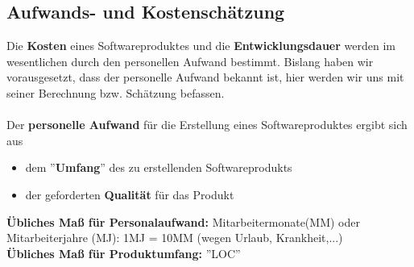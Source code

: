\subsection{Aufwands- und Kostenschätzung}
Die \textbf{Kosten} eines Softwareproduktes und die \textbf{Entwicklungsdauer} werden im wesentlichen durch den personellen Aufwand bestimmt. Bislang haben wir vorausgesetzt, dass der personelle Aufwand bekannt ist, hier werden wir uns mit seiner Berechnung bzw. Schätzung befassen.
\\
\\
Der \textbf{personelle Aufwand} für die Erstellung eines Softwareproduktes ergibt sich aus
\begin{itemize}
	\item dem ''\textbf{Umfang}'' des zu erstellenden Softwareprodukts
	\item der geforderten \textbf{Qualität} für das Produkt
\end{itemize}
\textbf{Übliches Maß für Personalaufwand:} Mitarbeitermonate(MM) oder Mitarbeiterjahre (MJ): 1MJ = 10MM (wegen Urlaub, Krankheit,...)
\\
\textbf{Übliches Maß für Produktumfang:} ''LOC''

